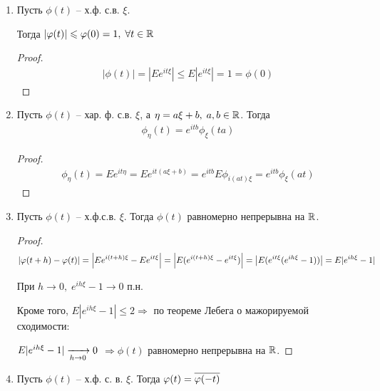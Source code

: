 
\begin{enumerate}[label=\protect\circled{\arabic*},series=charfunc_properties]
  \item
    Пусть $\phi(t)$ -- х.ф. с.в. $\xi$. 

    Тогда $|\varphi(t)| \leqslant \varphi(0) = 1, \; \forall t \in \mathbb{R}$
    \begin{proof}
      \begin{align*}
        |\phi(t)| = |E e^{i t \xi}| \leq E |e^{i t \xi}| = 1 = \phi(0)
      \end{align*}
    \end{proof}

  \item 
    Пусть $\phi(t)$ -- хар. ф. с.в. $\xi$, а $\eta = a \xi + b, \; a, b \in \mathbb{R}$.
    Тогда
    \begin{align*}
      \phi_{\eta} (t) = e^{i t b} \phi_{\xi} (t a)
    \end{align*}

    \begin{proof}
      \begin{align*}
        \phi_{\eta} (t) = E e^{i t \eta} = E e^{i t (a \xi + b)} 
        = e^{i t b} E \phi_{i (a t) \xi} = e^{i t b} \phi_\xi (at)
      \end{align*}
    \end{proof}

  \item
    Пусть $\phi(t)$ -- х.ф.с.в. $\xi$. 
    Тогда $\phi(t)$ равномерно непрерывна на $\mathbb{R}$.

    \begin{proof}
      \begin{align*}
        |\varphi(t + h) - \varphi(t)| = \left | E e^{i (t + h) \xi} - E e^{i t \xi} \right | 
        = \left | E(e^{i(t + h)\xi} - e^{i t \xi}) \right | = \left | E(e^{i t \xi} (e^{i h \xi} - 1)) \right |
        = E |e^{i h \xi} - 1|
      \end{align*}
      
      При $h \to 0, \; e^{i h \xi} - 1 \to 0$ п.н. 

      Кроме того, $E|e^{i h \xi} - 1| \leq 2 \Rightarrow$
      по теореме Лебега о мажорируемой сходимости:

      $E|e^{i h \xi} - 1| \xrightarrow[h \to 0]{} 0$ 
      $\Rightarrow \phi(t)$  равномерно непрерывна на $\mathbb{R}$.
    \end{proof}

  \item
    Пусть $\phi(t)$ -- х.ф. с. в. $\xi$. Тогда $\varphi(t) = \overline{\varphi(-t)}$


\end{enumerate}
